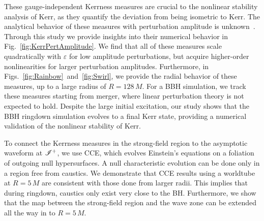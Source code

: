 

These gauge-independent Kerrness measures are crucial to the nonlinear stability analysis of Kerr, as they quantify the deviation from being isometric to Kerr. The analytical behavior of these measures with perturbation amplitude is unknown~\cite{Ionescu:2014cta, loboprivate}. Through this study we provide insights into their numerical behavior in Fig.~\ref{fig:KerrPertAmplitude}. We find that all of these measures scale quadratically with $\varepsilon$ for low amplitude perturbations, but acquire  higher-order nonlinearities for larger perturbation amplitudes. Furthermore, in Figs.~\ref{fig:Rainbow}~and~\ref{fig:Swirl}, we provide the radial behavior of these measures, up to a large radius of $R=128\,M$. For a BBH simulation, we track these measures starting from merger, where linear perturbation theory is not expected to hold. Despite the large initial excitation, our study shows that the BBH ringdown simulation evolves to a final Kerr state, providing a numerical validation of the nonlinear stability of Kerr. 

To connect the Kerrness measures in the strong-field region to the asymptotic waveform at $\mathscr{I^+}$, we use CCE, which evolves Einstein's equations on a foliation of outgoing null hypersurfaces.
A null characteristic evolution can be done only in a region free from caustics. We demonstrate that CCE results using a worldtube at $R=5\,M$ are consistent with those done from larger radii. This implies that during ringdown, caustics only exist very close to the BH. Furthermore, we show that the map between the strong-field region and the wave zone can be extended all the way in to $R=5\,M$.

